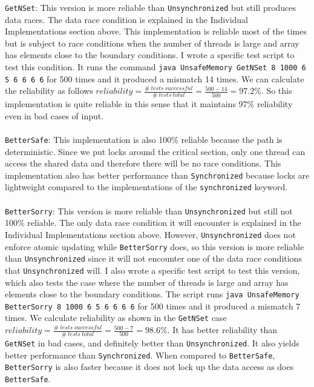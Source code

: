\documentclass[10pt]{article}
\begin{document}
\texttt{GetNSet}: This version is more reliable than \texttt{Unsynchronized} but still produces data races. The data race condition is explained in the Individual Implementations section above. This implementation is reliable most of the times but is subject to race conditions when the number of threads is large and array has elements close to the boundary conditions. I wrote a specific test script to test this condition. It runs the command \texttt{java UnsafeMemory GetNSet 8 1000 6 5 6 6 6 6} for 500 times and it produced a mismatch 14 times. We can calculate the reliability as follows $reliability = \frac{\# \ tests\ successful}{\#\ tests\ total} = \frac{500-14}{500} = 97.2\%$. So this implementation is quite reliable in this sense that it maintains 97\% reliability even in bad cases of input. \\ \\
\texttt{BetterSafe}: This implementation is also 100\% reliable because the path is deterministic. Since we put locks around the critical section, only one thread can access the shared data and therefore there will be no race conditions. This implementation also has better performance than \texttt{Synchronized} because locks are lightweight compared to the implementations of the \texttt{synchronized} keyword. \\ \\
\texttt{BetterSorry}: This version is more reliable than \texttt{Unsynchronized} but still not 100\% reliable. The only data race condition it will encounter is explained in the Individual Implementations section above. However, \texttt{Unsynchronized} does not enforce atomic updating while \texttt{BetterSorry} does, so this version is more reliable than \texttt{Unsynchronized} since it will not encounter one of the data race conditions that \texttt{Unsynchronized} will. I also wrote a specific test script to test this version, which also tests the case where the number of threads is large and array has elements close to the boundary conditions. The script runs \texttt{java UnsafeMemory BetterSorry 8 1000 6 5 6 6 6 6} for 500 times and it produced a mismatch 7 times. We calculate reliability as shown in the \texttt{GetNSet} case $reliability = \frac{\# \ tests\ successful}{\#\ tests\ total} = \frac{500-7}{500} = 98.6\%$. It has better reliability than \texttt{GetNSet} in bad cases, and definitely better than \texttt{Unsynchronized}. It also yields better performance than \texttt{Synchronized}. When compared to \texttt{BetterSafe}, \texttt{BetterSorry} is also faster because it does not lock up the data access as does \texttt{BetterSafe}.
\end{document}
